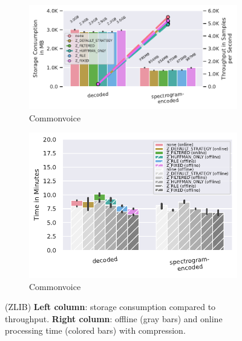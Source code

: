 \documentclass[sigconf,nonacm]{acmart}
\begin{document}
\begin{figure}[b]
  \begin{subfigure}{0.49 \columnwidth}
    \includegraphics[width=\linewidth]{../images/commonvoice-strategy/compressed-storage-vs-throughput.pdf}
    \caption{Commonvoice}
    \Description{}
    \label{fig:zlib-strategy-commonvoice-compressed-storage-vs-throughput}
  \end{subfigure}
  \hfill %
  \begin{subfigure}{0.49 \columnwidth}
    \includegraphics[width=\linewidth]{../images/commonvoice-strategy/compression-processing-time-split.pdf}
    \caption{Commonvoice}
    \Description{}
    \label{fig:zlib-strategy-commonvoice-compression-processing-time-split}
  \end{subfigure}
  
  \caption{(ZLIB) \textbf{Left column}: storage consumption compared to throughput. \textbf{Right column}: offline (gray bars) and online processing time (colored bars) with compression.}
  \label{fig:zlib-experiments}
\end{figure}
\end{document}
